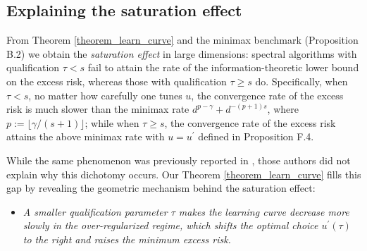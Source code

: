 \documentclass{article}
\theoremstyle{plain}
\theoremstyle{definition}
\theoremstyle{remark}
\begin{document}

\subsection{Explaining the saturation effect}

From Theorem \ref{theorem_learn_curve} and the minimax benchmark (Proposition B.2) we obtain the \emph{saturation effect} in large dimensions: spectral algorithms with qualification \(\tau < s\) fail to attain the rate of the information-theoretic lower bound on the excess risk, whereas those with qualification \(\tau \geq s\) do. Specifically, when \(\tau < s\), no matter how carefully one tunes $u$, the convergence rate of the excess risk is much slower than the minimax rate $d^{p-\gamma}+d^{-(p+1)s}$, where $p:=\lfloor \gamma / (s+1) \rfloor$; while when \(\tau \geq s\), the convergence rate of the excess risk attains the above minimax rate with $u = u^{\prime}$ defined in Proposition F.4.

While the same phenomenon was previously reported in \citet{zhang2024optimal, lu2024saturation}, those authors did not explain why this dichotomy occurs. 
Our Theorem \ref{theorem_learn_curve} fills this gap by revealing the geometric mechanism behind the saturation effect: 
\begin{itemize}
    \item []
    \textit{A smaller qualification parameter $\tau$ makes the learning curve decrease more slowly in the over-regularized regime, which shifts the optimal choice $u^{\prime}(\tau)$ to the right and raises the minimum excess risk.}
\end{itemize}
\end{document}
